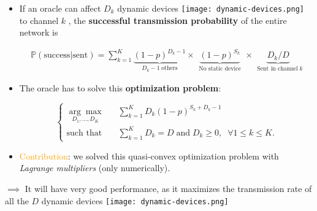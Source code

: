 \begin{frameO}

    \begin{itemize}
        \item
              If an oracle can affect \(D_k\) dynamic devices \texttt{[image: dynamic-devices.png]}  to channel
              \(k\) \slotmachine{}, the \textbf{successful transmission probability} of the entire network is
              \vspace*{-10pt}

              \begin{small} \begin{align*}
                      \mathbb{P}(\text{success}|\text{sent}) = \sum_{k=1}^{K} \underbrace{(1 - p)^{D_k - 1}}_{\;\;D_k - 1 \;\text{others}\;\;} \times \underbrace{(1 - p)^{S_k}}_{\;\;\text{No static device}\;\;} \times \underbrace{ D_k / D }_{\;\;\text{Sent in channel}\; k}
                  \end{align*} \end{small}
              \pause
        \item
              The oracle has to solve this \textbf{optimization problem}:
              \vspace*{-5pt}

              \begin{small} \begin{equation*} \begin{cases}
                          \underset{D_1,\dots,D_{K}}{\arg\max}\;\;\; & \sum\limits_{k=1}^{K} D_k (1 - p)^{S_k + D_k -1}                                           \\
                          \text{such that}\;\;\;                     & \sum\limits_{k=1}^{K} D_k = D \; \text{and} \; D_k \geq 0, \; \; \forall 1 \leq k \leq K .
                      \end{cases} \end{equation*} \end{small}
        \item
              \textcolor{orange}{Contribution}: we solved this quasi-convex optimization problem with \emph{Lagrange
                  multipliers} (only numerically).
    \end{itemize}

    \vfill{}
    \begin{colorblock}{}
        \(\implies\) It will have very good performance, as it maximizes the transmission rate of all the \(D\) dynamic devices
        \texttt{[image: dynamic-devices.png]}
    \end{colorblock}

\end{frameO}

